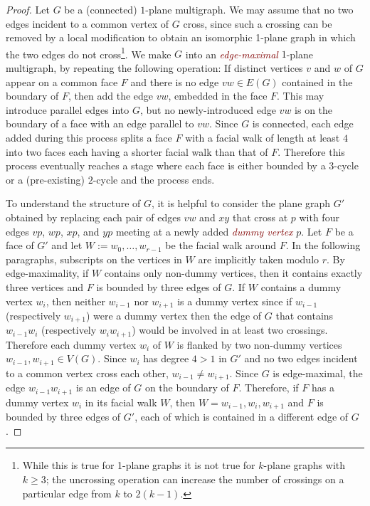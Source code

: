 \documentclass{patmorin}
\theoremstyle{plain}
\theoremstyle{definition}
\newcommand{\defin}[1]{\textcolor{Maroon}{\emph{#1}}}
\newcommand{\note}[2]{\noindent{\color{red}[#1:~#2]}}
\renewcommand{\ge}{\geqslant}
\begin{document}
\begin{proof}
Let $G$ be a (connected) $1$-plane multigraph. We may assume that no two edges incident to a common vertex of $G$ cross, since such a crossing can be removed by a local modification to obtain an isomorphic 1-plane graph in which the two edges do not cross\footnote{While this is true for 1-plane graphs it is not true for $k$-plane graphs with $k\ge 3$; the uncrossing operation can increase the number of crossings on a particular edge from $k$ to $2(k-1)$.}. We make $G$ into an \defin{edge-maximal} $1$-plane multigraph, by repeating the following operation:  If distinct vertices $v$ and $w$ of $G$ appear on a common face $F$ and there is no edge $vw\in E(G)$ contained in the boundary of $F$, then add the edge $vw$, embedded in the face $F$.  This may introduce parallel edges into $G$, but no newly-introduced edge $vw$ is on the boundary of a face with an edge parallel to $vw$.  Since $G$ is connected, each edge added during this process splits a face $F$ with a facial walk of length at least $4$ into two faces each having a shorter facial walk than that of $F$.
Therefore this process eventually reaches a stage where each face is either bounded by a $3$-cycle or a (pre-existing) $2$-cycle and the process ends.


To understand the structure of $G$, it is helpful to consider the plane graph $G'$  obtained by replacing each pair of edges $vw$ and $xy$ that cross at $p$ with four edges $vp$, $wp$, $xp$, and $yp$ meeting at a newly added \defin{dummy vertex} $p$. Let $F$ be a face of $G'$ and let $W:=w_0,\ldots,w_{r-1}$ be the facial walk around $F$. In the following paragraphs, subscripts on the vertices in $W$ are implicitly taken modulo $r$. By edge-maximality, if $W$ contains only non-dummy vertices, then it contains exactly three vertices and $F$ is bounded by three edges of $G$. If $W$ contains a dummy vertex $w_i$, then neither $w_{i-1}$ nor $w_{i+1}$ is a dummy vertex since if $w_{i-1}$ (respectively $w_{i+1}$) were a dummy vertex then the edge of $G$ that contains $w_{i-1}w_i$ (respectively $w_iw_{i+1}$) would be involved in at least two crossings.  Therefore each dummy vertex $w_i$ of $W$ is flanked by two non-dummy vertices $w_{i-1},w_{i+1}\in V(G)$.  Since $w_i$ has degree $4>1$ in $G'$ and no two edges incident to a common vertex cross each other, $w_{i-1}\neq w_{i+1}$.  Since $G$ is edge-maximal, the edge $w_{i-1}w_{i+1}$ is an edge of $G$ on the boundary of $F$.  Therefore, if $F$ has a dummy vertex $w_i$ in its facial walk $W$, then $W=w_{i-1},w_i,w_{i+1}$ and $F$ is bounded by three edges of $G'$, each of which is contained in a different edge of $G$.


\end{proof}
\end{document}
